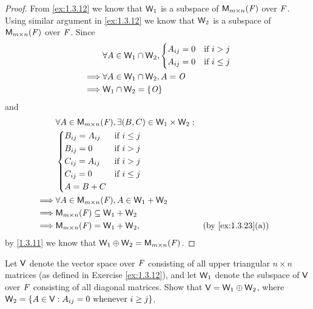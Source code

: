\begin{proof}
  From \cref{ex:1.3.12} we know that \(\mathsf{W}_1\) is a subspace of \(\mathsf{M}_{{m} \times n}({\mathit{F}})\) over \(\mathit{F}\).
  Using similar argument in \cref{ex:1.3.12} we know that \(\mathsf{W}_2\) is a subspace of \(\mathsf{M}_{{m} \times n}({\mathit{F}})\) over \(\mathit{F}\).
  Since
  \begin{align*}
             & \forall A \in \mathsf{W}_1 \cap \mathsf{W}_2, \begin{dcases}
      A_{i j} = 0 & \text{if } i > j    \\
      A_{i j} = 0 & \text{if } i \leq j
    \end{dcases} \\
    \implies & \forall A \in \mathsf{W}_1 \cap \mathsf{W}_2, A = \mathit{O}                    \\
    \implies & \mathsf{W}_1 \cap \mathsf{W}_2 = \left\lbrace\mathit{O}\right\rbrace
  \end{align*}
  and
  \begin{align*}
             & \forall A \in \MS, \exists (B, C) \in \W_1 \times \W_2 :                                      \\
             & \begin{dcases}
      B_{i j} = A_{i j} & \text{if } i \leq j \\
      B_{i j} = 0       & \text{if } i > j    \\
      C_{i j} = A_{i j} & \text{if } i > j    \\
      C_{i j} = 0       & \text{if } i \leq j \\
      A = B + C
    \end{dcases}                                                                    \\
    \implies & \forall A \in \MS, A \in \W_1 + \W_2                                                          \\
    \implies & \MS \subseteq \W_1 + \W_2                                                                     \\
    \implies & \MS = \W_1 + \W_2,                                       &  & \text{(by \cref{ex:1.3.23}(a))}
  \end{align*}
  by \cref{1.3.11} we know that \(\mathsf{W}_1 \oplus \mathsf{W}_2 = \mathsf{M}_{{m} \times n}({\mathit{F}})\).
\end{proof}

\begin{ex}\label{ex:1.3.27}
  Let \(\mathsf{V}\) denote the vector space over \(\mathit{F}\) consisting of all upper triangular \(n \times n\) matrices (as defined in Exercise \cref{ex:1.3.12}), and let \(\mathsf{W}_1\) denote the subspace of \(\mathsf{V}\) over \(\mathit{F}\) consisting of all diagonal matrices.
  Show that \(\mathsf{V} = \mathsf{W}_1 \oplus \mathsf{W}_2\), where \(\mathsf{W}_2 = \left\lbrace A \in \mathsf{V} : A_{i j} = 0 \text{ whenever } i \geq j\right\rbrace\).
\end{ex}

